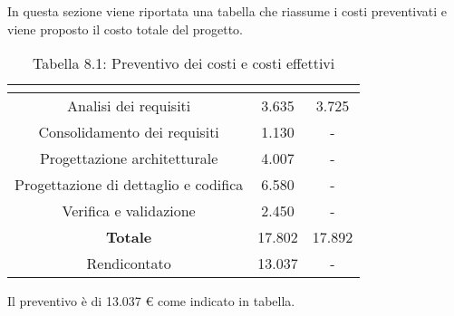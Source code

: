 In questa sezione viene riportata una tabella che riassume i costi preventivati e viene proposto il costo totale del progetto.
\\
\renewcommand{\arraystretch}{1.5}
\begin{table}[H]
\begin{center}
\begin{tabular}{|c|c|c|}
\hline
\rowcolor{title_row}
\textbf{\color{title_text}{Periodo}}  & \textbf{\color{title_text}{Preventivo \euro}} & \textbf{\color{title_text}{Consuntivo \euro}} \\ \hline
Analisi dei requisiti   & 3.635 & 3.725 \\ \hline
Consolidamento dei requisiti   & 1.130 & - \\ \hline
Progettazione architetturale    & 4.007 & - \\ \hline
Progettazione di dettaglio e codifica    & 6.580 & - \\ \hline
Verifica e validazione    & 2.450 & - \\ \hline
\textbf{Totale}   & 17.802 & 17.892 \\ \hline
Rendicontato   & 13.037 & - \\ \hline
\end{tabular}
\caption{Tabella 8.1: Preventivo dei costi e costi effettivi\label{}}
\end{center}
\end{table}
\renewcommand{\arraystretch}{1}

Il preventivo è di 13.037 \euro{} come indicato in tabella.  
\newpage
